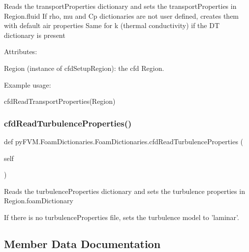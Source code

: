 \begin{DoxyVerb}Reads the transportProperties dictionary and sets the 
   transportProperties in Region.fluid If rho, mu and Cp dictionaries 
   are not user defined, creates them with default air properties
   Same for k (thermal conductivity) if the DT dictionary is present
   
Attributes:
    
   Region (instance of cfdSetupRegion): the cfd Region.
   
Example usage:
    
    cfdReadTransportProperties(Region)\end{DoxyVerb}
 \mbox{\label{classpy_f_v_m_1_1_foam_dictionaries_1_1_foam_dictionaries_a1780db01d9935185bd2922dece68b409}} 
\subsubsection{\texorpdfstring{cfdReadTurbulenceProperties()}{cfdReadTurbulenceProperties()}}
{\footnotesize\ttfamily def py\+F\+V\+M.\+Foam\+Dictionaries.\+Foam\+Dictionaries.\+cfd\+Read\+Turbulence\+Properties (\begin{DoxyParamCaption}\item[{}]{self }\end{DoxyParamCaption})}

\begin{DoxyVerb}Reads the turbulenceProperties dictionary 
   and sets the turbulence properties in Region.foamDictionary
   
   
   If there is no turbulenceProperties file, sets the turbulence
   model to 'laminar'.   
\end{DoxyVerb}
 

\subsection{Member Data Documentation}
\mbox{\label{classpy_f_v_m_1_1_foam_dictionaries_1_1_foam_dictionaries_adebfb1a5f1e0985c3649a957ef8ce443}} 
